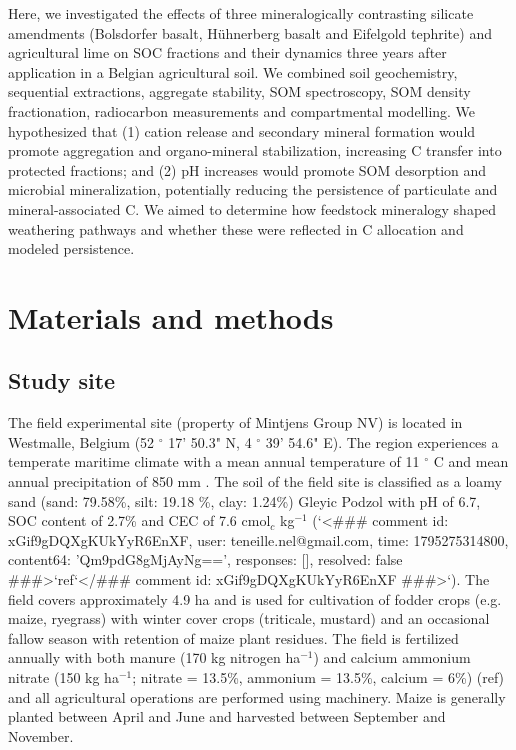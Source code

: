 \documentclass[preprint,12pt]{elsarticle}
\begin{document}
Here, we investigated the effects of three mineralogically contrasting silicate amendments (Bolsdorfer basalt, H\"uhnerberg basalt and Eifelgold tephrite) and agricultural lime on SOC fractions and their dynamics three years after application in a Belgian agricultural soil. We combined soil geochemistry, sequential extractions, aggregate stability, SOM spectroscopy, SOM density fractionation, radiocarbon measurements and compartmental modelling. We hypothesized that (1) cation release and secondary mineral formation would promote aggregation and organo-mineral stabilization, increasing C transfer into protected fractions; and (2) pH increases would promote SOM desorption and microbial mineralization, potentially reducing the persistence of particulate and mineral-associated C. We aimed to determine how feedstock mineralogy shaped weathering pathways and whether these were reflected in C allocation and modeled persistence.

\section{Materials and methods}
\label{sec:methods}

\subsection{Study site}
\label{subsec:study_site}

The field experimental site (property of Mintjens Group NV) is located in Westmalle, Belgium (52 $^\circ$ 17' 50.3" N, 4 $^\circ$ 39' 54.6" E). The region experiences a temperate maritime climate with a mean annual temperature of 11 $^\circ$ C and mean annual precipitation of 850 mm \citep{Meteovista}. The soil of the field site is classified as a loamy sand (sand: 79.58\%, silt: 19.18 \%, clay: 1.24\%) Gleyic Podzol \citep{WorldReferenceBaseforSoilResources2014} with pH of 6.7, SOC content of 2.7\% and CEC of 7.6 cmol$_c$ kg$^{-1}$ (`<### comment id: xGif9gDQXgKUkYyR6EnXF, user: teneille.nel@gmail.com, time: 1795275314800, content64: 'Qm9pdG8gMjAyNg==', responses: [], resolved: false ###>`ref`</### comment id: xGif9gDQXgKUkYyR6EnXF ###>`). The field covers approximately 4.9 ha and is used for cultivation of fodder crops (e.g. maize, ryegrass) with winter cover crops (triticale, mustard) and an occasional fallow season with retention of maize plant residues. The field is fertilized annually with both manure (170 kg nitrogen ha$^{-1}$) and calcium ammonium nitrate (150 kg ha$^{-1}$; nitrate = 13.5\%, ammonium = 13.5\%, calcium = 6\%) (ref) and all agricultural operations are performed using machinery. Maize is generally planted between April and June and harvested between September and November. 
\end{document}
